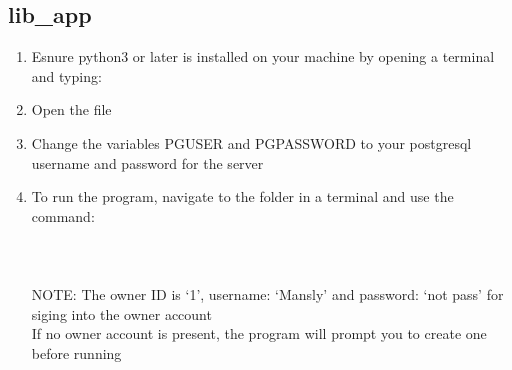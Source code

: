 \documentclass[a4 paper]{article}
\begin{document}
\subsection{lib\_app}
\begin{enumerate}
\item Esnure python3 or later is installed on your machine by opening a terminal and typing: 
\item Open the file 
\item Change the variables PGUSER and PGPASSWORD to your postgresql username and password for the server
\item To run the program, navigate to the  folder in a terminal and use the command: \\\\
\\\\NOTE: The owner ID is `1', username: `Mansly' and password: `not pass' for siging into the owner account\\
If no owner account is present, the program will prompt you to create one before running
\end{enumerate}
\end{document}

